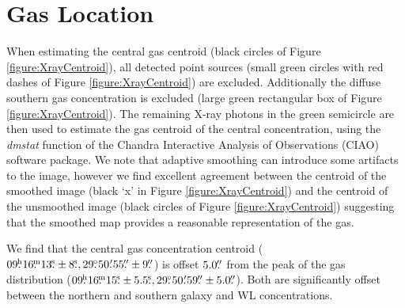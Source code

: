 \section{Gas Location}

When estimating the central gas centroid (black circles of Figure \ref{figure:XrayCentroid}), all detected point sources (small green circles with red dashes of Figure \ref{figure:XrayCentroid}) are excluded.
Additionally the diffuse southern gas concentration is excluded (large green rectangular box of Figure \ref{figure:XrayCentroid}).
The remaining X-ray photons in the green semicircle are then used to estimate the gas centroid of the central concentration, using  the \textit{dmstat} function of the Chandra Interactive Analysis of Observations (CIAO) software package.
We note that adaptive smoothing can introduce some artifacts to the image, however we find excellent agreement between the centroid of the smoothed image (black `x' in Figure \ref{figure:XrayCentroid}) and the centroid of the unsmoothed image (black circles of Figure \ref{figure:XrayCentroid}) suggesting that the smoothed map provides a reasonable representation of the gas.

We find that the central gas concentration centroid ($09\fh16\fm13\fs\pm8\fs, 29\fdg50\farcm55\farcs\pm9\farcs$) is offset $5.0\mbox{$.\!\!^{\prime\prime}$}$ from the peak of the gas distribution ($09\fh16\fm15\fs\pm5.5\fs, 29\fdg50\farcm59\farcs\pm5.0\farcs$).
Both are significantly offset between the northern and southern galaxy and WL concentrations.

